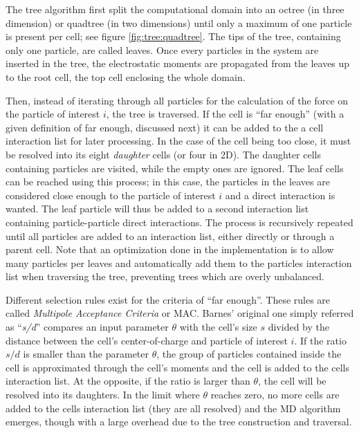 The tree algorithm first split the computational domain into an octree (in
three dimension) or quadtree (in two dimensions) until
only a maximum of one particle is present per cell; see figure
\ref{fig:tree:quadtree}. The tips of the tree, containing only one particle,
are called leaves. Once every particles in the system are inserted in the tree,
the electrostatic moments are propagated from the leaves up to the root cell,
the top cell enclosing the whole domain.

Then, instead of iterating through all particles for the calculation of the
force on the particle of interest $i$, the tree is traversed. If the cell is
``far enough'' (with a given definition of far enough, discussed next) it can
be added to the a cell interaction list for later processing. In the case of
the cell being too close, it must be resolved into its  eight \textit{daughter}
cells (or four in 2D). The daughter cells containing particles are visited, while the empty
ones are ignored. The leaf cells can be reached using this process; in this
case, the particles in the leaves are considered close enough to the particle
of interest $i$ and a direct interaction is wanted. The leaf particle will thus
be added to a second interaction list containing particle-particle direct
interactions. The process is recursively repeated until all particles
are added to an interaction list, either directly or through a parent cell.
Note that an optimization done in the
implementation is to allow many particles per leaves and automatically add them
to the particles interaction list when traversing the tree, preventing trees
which are overly unbalanced.

Different selection rules exist for the criteria of ``far enough''. These
rules are called \textit{Multipole Acceptance Criteria} or
MAC\cite{Pfalzner1996}. Barnes' original one simply referred as
``\textit{s/d}'' compares an input parameter $\theta$ with the cell's size $s$
divided by the distance between the cell's center-of-charge and particle of
interest $i$. If the ratio $s/d$ is smaller than the parameter $\theta$, the
group of particles contained inside the cell is approximated through the cell's
moments and the cell is added to the cells interaction list. At the opposite, if
the ratio is larger than $\theta$, the cell will be resolved into its daughters.
In the limit where $\theta$ reaches zero, no more cells are added to the
cells interaction list (they are all resolved) and the MD algorithm emerges, though
with a large overhead due to the tree construction and traversal.

